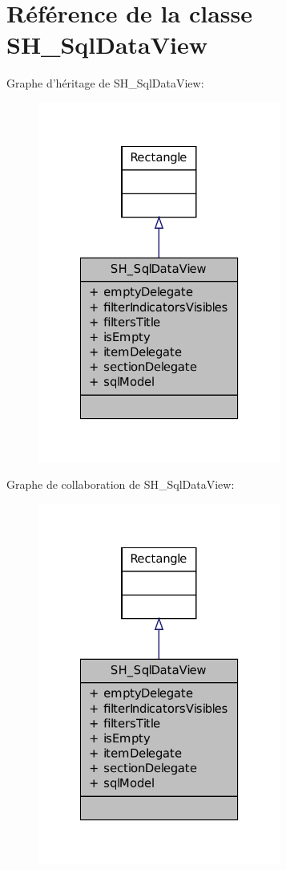 \hypertarget{classSH__SqlDataView}{\section{Référence de la classe S\-H\-\_\-\-Sql\-Data\-View}
\label{classSH__SqlDataView}
}


Graphe d'héritage de S\-H\-\_\-\-Sql\-Data\-View\-:\nopagebreak
\begin{figure}[H]
\begin{center}
\leavevmode
\includegraphics[width=226pt]{classSH__SqlDataView__inherit__graph}
\end{center}
\end{figure}


Graphe de collaboration de S\-H\-\_\-\-Sql\-Data\-View\-:\nopagebreak
\begin{figure}[H]
\begin{center}
\leavevmode
\includegraphics[width=226pt]{classSH__SqlDataView__coll__graph}
\end{center}
\end{figure}
